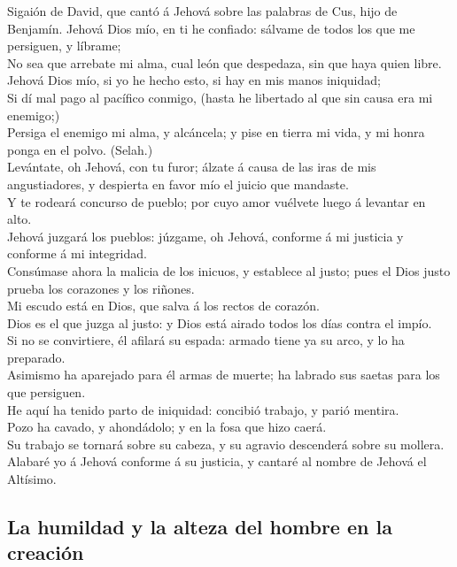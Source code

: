  Sigaión de David, que cantó á Jehová sobre las palabras
de Cus, hijo de Benjamín. Jehová Dios mío, en ti he confiado: sálvame de
todos los que me persiguen, y líbrame;\\
 No sea que arrebate mi alma, cual león que despedaza, sin
que haya quien libre.\\
 Jehová Dios mío, si yo he hecho esto, si hay en mis manos
iniquidad;\\
 Si dí mal pago al pacífico conmigo, (hasta he libertado
al que sin causa era mi enemigo;)\\
 Persiga el enemigo mi alma, y alcáncela; y pise en tierra
mi vida, y mi honra ponga en el polvo. (Selah.)\\
 Levántate, oh Jehová, con tu furor; álzate á causa de las
iras de mis angustiadores, y despierta en favor mío el juicio que
mandaste.\\
 Y te rodeará concurso de pueblo; por cuyo amor vuélvete
luego á levantar en alto.\\
 Jehová juzgará los pueblos: júzgame, oh Jehová, conforme
á mi justicia y conforme á mi integridad.\\
 Consúmase ahora la malicia de los inicuos, y establece al
justo; pues el Dios justo prueba los corazones y los riñones.\\
 Mi escudo está en Dios, que salva á los rectos de
corazón.\\
 Dios es el que juzga al justo: y Dios está airado todos
los días contra el impío.\\
 Si no se convirtiere, él afilará su espada: armado tiene
ya su arco, y lo ha preparado.\\
 Asimismo ha aparejado para él armas de muerte; ha
labrado sus saetas para los que persiguen.\\
 He aquí ha tenido parto de iniquidad: concibió trabajo,
y parió mentira.\\
 Pozo ha cavado, y ahondádolo; y en la fosa que hizo
caerá.\\
 Su trabajo se tornará sobre su cabeza, y su agravio
descenderá sobre su mollera.\\
 Alabaré yo á Jehová conforme á su justicia, y cantaré al
nombre de Jehová el Altísimo.

\hypertarget{la-humildad-y-la-alteza-del-hombre-en-la-creaciuxf3n}{%
\subsection{La humildad y la alteza del hombre en la
creación}\label{la-humildad-y-la-alteza-del-hombre-en-la-creaciuxf3n}}

